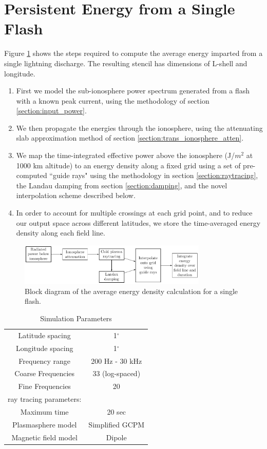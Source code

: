 \section{Persistent Energy from a Single Flash}
Figure \ref{fig:power_blockdiagram} shows the steps required to compute the average energy imparted from a single lightning discharge. The resulting stencil has dimensions of L-shell and longitude.
\begin{enumerate}
\item{First we model the sub-ionosphere power spectrum generated from a flash with a known peak current, using the methodology of section \ref{section:input_power}.}
\item{We then propagate the energies through the ionosphere, using the attenuating slab approximation method of section \ref{section:trans_ionosphere_atten}.}
\item{We map the time-integrated effective power above the ionosphere (J/$m^2$ at 1000 km altitude) to an energy density along a fixed grid using a set of pre-computed ``guide rays" using the methodology in section \ref{section:raytracing}, the Landau damping from section \ref{section:damping}, and the novel interpolation scheme described below.}
\item{In order to account for multiple crossings at each grid point, and to reduce our output space across different latitudes, we store the time-averaged energy density along each field line.}
 \end{enumerate}
\begin{figure}
\begin{center}
\includegraphics[width=0.8\textwidth]{figures/lightning_power_block_diagram.pdf}
\caption[Energy density calculation block diagram]{Block diagram of the average energy density calculation for a single flash.}
\label{fig:power_blockdiagram}
\end{center}
\end{figure}


\begin{table}
\caption{Simulation Parameters}
\begin{center}
\begin{tabular}{c|c}
Latitude spacing & 1$^\circ$ \\
Longitude spacing & 1$^\circ$ \\
Frequency range & 200 Hz - 30 kHz \\
Coarse Frequencies & 33 (log-spaced) \\
Fine Frequencies & 20 \\
\hline
ray tracing parameters: & \\
Maximum time & 20 sec \\
Plasmasphere model & Simplified GCPM \\
Magnetic field model & Dipole 
\end{tabular}
\end{center}
\label{tab:simulation_params}
\end{table}%

